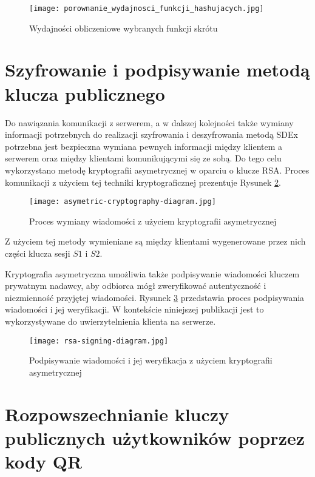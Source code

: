 \documentclass[../main.tex]{subfiles}
\begin{document}
\begin{figure}[H]
	\centering
	\texttt{[image: porownanie\_wydajnosci\_funkcji\_hashujacych.jpg]}
	\caption{Wydajności obliczeniowe wybranych funkcji skrótu\cite{sdex_publikacja_2022}}
	\label{fig:hash_efficiency_comparison}
\end{figure}

\section{Szyfrowanie i podpisywanie metodą klucza publicznego}

Do nawiązania komunikacji z serwerem, a w dalszej kolejności także wymiany informacji potrzebnych do realizacji szyfrowania i deszyfrowania metodą SDEx potrzebna jest bezpieczna wymiana pewnych informacji między klientem a serwerem oraz między klientami komunikującymi się ze sobą. Do tego celu wykorzystano metodę kryptografii asymetrycznej w oparciu o klucze RSA. Proces komunikacji z użyciem tej techniki kryptograficznej prezentuje Rysunek \ref{fig:asymetric_cryptography_diagram}.

\begin{figure}[H]
	\centering
	\texttt{[image: asymetric-cryptography-diagram.jpg]}
	\caption{Proces wymiany wiadomości z użyciem kryptografii asymetrycznej\cite{sdex_publikacja_2016}}
	\label{fig:asymetric_cryptography_diagram}
\end{figure}

Z użyciem tej metody wymieniane są między klientami wygenerowane przez nich części klucza sesji $S1$ i $S2$.

Kryptografia asymetryczna umożliwia także podpisywanie wiadomości kluczem prywatnym nadawcy, aby odbiorca mógł zweryfikować autentyczność i niezmienność przyjętej wiadomości. Rysunek \ref{fig:rsa_signing_diagram} przedstawia proces podpisywania wiadomości i jej weryfikacji. W kontekście niniejszej publikacji jest to wykorzystywane do uwierzytelnienia klienta na serwerze.

\begin{figure}[H]
	\centering
	\texttt{[image: rsa-signing-diagram.jpg]}
	\caption{Podpisywanie wiadomości i jej weryfikacja z użyciem kryptografii asymetrycznej\cite{rsa_signing_and_verification}}
	\label{fig:rsa_signing_diagram}
\end{figure}

\section{Rozpowszechnianie kluczy publicznych użytkowników poprzez kody QR}
\end{document}
